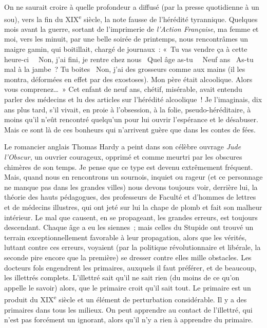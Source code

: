 \documentclass[french,twoside]{book} %
\begin{document}
On ne saurait croire à quelle profondeur a diffusé (par la presse quotidienne à un sou), vers la fin du XIX\textsuperscript{e} siècle, la note fausse de l’hérédité tyrannique. Quelques mois avant la guerre, sortant de l’imprimerie de {\itshape l’Action Française}, ma femme et moi, vers les minuit, par une belle soirée de printemps, nous rencontrâmes un maigre gamin, qui boitillait, chargé de journaux : « Tu vas vendre ça à cette heure-ci   Non, j’ai fini, je rentre chez nous  Quel âge as-tu   Neuf ans  As-tu mal à la jambe ? Tu boites  Non, j’ai des grosseurs comme aux mains (il les montra, déformées en effet par des exostoses). Mon père était alcoolique. Alors vous comprenez… » Cet enfant de neuf ans, chétif, misérable, avait entendu parler des médecins et lu des articles sur l’hérédité alcoolique ! Je l’imaginais, dix ans plus tard, s’il vivait, en proie à l’obsession, à la folie, pseudo-héréditaire, à moins qu’il n’eût rencontré quelqu’un pour lui ouvrir l’espérance et le désabuser. Mais ce sont là de ces bonheurs qui n’arrivent guère que dans les contes de fées.\par
Le romancier anglais Thomas Hardy a peint dans son célèbre ouvrage {\itshape Jude l’Obscur}, un ouvrier courageux, opprimé et comme meurtri par les obscures chimères de son temps. Je pense que ce type est devenu extrêmement fréquent. Mais, quand nous en rencontrons un sournois, inquiet ou rageur (et ce personnage ne manque pas dans les grandes villes) nous devons toujours voir, derrière lui, la théorie des hauts pédagogues, des professeurs de Faculté et d’hommes de lettres et de médecins illustres, qui ont jeté sur lui la chape de plomb et fait son malheur intérieur. Le mal que causent, en se propageant, les grandes erreurs, est toujours descendant. Chaque âge a eu les siennes ; mais celles du Stupide ont trouvé un terrain exceptionnellement favorable à leur propagation, alors que les vérités, luttant contre ces erreurs, voyaient (par la politique révolutionnaire et libérale, la seconde pire encore que la première) se dresser contre elles mille obstacles. Les docteurs fols engendrent les primaires, auxquels il faut préférer, et de beaucoup, les illettrés complets. L’illettré sait qu’il ne sait rien (du moins de ce qu’on appelle le savoir) alors, que le primaire croit qu’il sait tout. Le primaire est un produit du XIX\textsuperscript{e} siècle et un élément de perturbation considérable. Il y a des primaires dans tous les milieux. On peut apprendre au contact de l’illettré, qui n’est pas forcément un ignorant, alors qu’il n’y a rien à apprendre du primaire.\par
\end{document}
